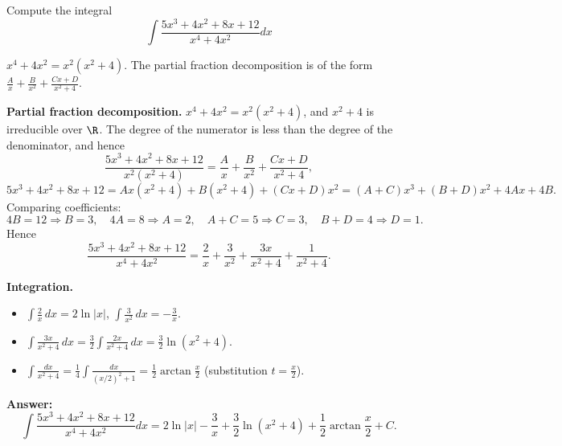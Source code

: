 
\begin{question}
Compute the integral
\[ \int\frac{5x^3+4x^2+8x+12}{x^4+4x^2}dx \]
\end{question}

\begin{hint}
$x^4+4x^2=x^2(x^2+4)$. The partial fraction decomposition is of the form $\frac Ax+\frac B{x^2}+\frac{Cx+D}{x^2+4}$.
\end{hint}

\begin{solution}
\textbf{Partial fraction decomposition.} $x^4+4x^2=x^2(x^2+4)$, and $x^2+4$ is irreducible over $\R$. The degree of the numerator is less than the degree of the denominator, and hence
\[ \frac{5x^3+4x^2+8x+12}{x^2(x^2+4)}=\frac Ax+\frac B{x^2}+\frac{Cx+D}{x^2+4}, \]
\[ 5x^3+4x^2+8x+12=Ax(x^2+4)+B(x^2+4)+(Cx+D)x^2=(A+C)x^3+(B+D)x^2+4Ax+4B. \]
Comparing coefficients:
\[ 4B=12\Rightarrow B=3,\quad 4A=8\Rightarrow A=2,\quad A+C=5\Rightarrow C=3,\quad B+D=4\Rightarrow D=1. \]
Hence
\[ \frac{5x^3+4x^2+8x+12}{x^4+4x^2}=\frac2x+\frac3{x^2}+\frac{3x}{x^2+4}+\frac{1}{x^2+4}. \]

\textbf{Integration.}
\begin{itemize}
  \item $\int\frac2x\,dx=2\ln|x|$, \quad $\int\frac3{x^2}\,dx=-\frac3x$.
  \item $\int\frac{3x}{x^2+4}\,dx=\frac32\int\frac{2x}{x^2+4}\,dx=\frac32\ln(x^2+4)$.
  \item $\int\frac{dx}{x^2+4}=\frac14\int\frac{dx}{(x/2)^2+1}=\frac12\arctan\frac x2$ (substitution $t=\frac x2$).
\end{itemize}

\textbf{Answer:}
\[ \int\frac{5x^3+4x^2+8x+12}{x^4+4x^2}dx=\boxed{2\ln|x|-\frac3x+\frac32\ln(x^2+4)+\frac12\arctan\frac x2+C}. \]
\end{solution}
